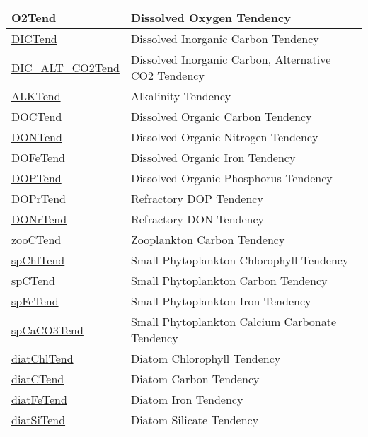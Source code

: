 {\begin{center}
\begin{longtable}{| p{2.0in} | p{4.0in} |}
    \hline
    \hyperref[subsec:var_sec_tend_O2Tend]{O2Tend} & Dissolved Oxygen Tendency \\
    \hline
    \hyperref[subsec:var_sec_tend_DICTend]{DICTend} & Dissolved Inorganic Carbon Tendency \\
    \hline
    \hyperref[subsec:var_sec_tend_DIC_ALT_CO2Tend]{DIC\_ALT\_CO2Tend} & Dissolved Inorganic Carbon, Alternative CO2 Tendency \\
    \hline
    \hyperref[subsec:var_sec_tend_ALKTend]{ALKTend} & Alkalinity Tendency \\
    \hline
    \hyperref[subsec:var_sec_tend_DOCTend]{DOCTend} & Dissolved Organic Carbon Tendency \\
    \hline
    \hyperref[subsec:var_sec_tend_DONTend]{DONTend} & Dissolved Organic Nitrogen Tendency \\
    \hline
    \hyperref[subsec:var_sec_tend_DOFeTend]{DOFeTend} & Dissolved Organic Iron Tendency \\
    \hline
    \hyperref[subsec:var_sec_tend_DOPTend]{DOPTend} & Dissolved Organic Phosphorus Tendency \\
    \hline
    \hyperref[subsec:var_sec_tend_DOPrTend]{DOPrTend} & Refractory DOP Tendency \\
    \hline
    \hyperref[subsec:var_sec_tend_DONrTend]{DONrTend} & Refractory DON Tendency \\
    \hline
    \hyperref[subsec:var_sec_tend_zooCTend]{zooCTend} & Zooplankton Carbon Tendency \\
    \hline
    \hyperref[subsec:var_sec_tend_spChlTend]{spChlTend} & Small Phytoplankton Chlorophyll Tendency \\
    \hline
    \hyperref[subsec:var_sec_tend_spCTend]{spCTend} & Small Phytoplankton Carbon Tendency \\
    \hline
    \hyperref[subsec:var_sec_tend_spFeTend]{spFeTend} & Small Phytoplankton Iron Tendency \\
    \hline
    \hyperref[subsec:var_sec_tend_spCaCO3Tend]{spCaCO3Tend} & Small Phytoplankton Calcium Carbonate Tendency \\
    \hline
    \hyperref[subsec:var_sec_tend_diatChlTend]{diatChlTend} & Diatom Chlorophyll Tendency \\
    \hline
    \hyperref[subsec:var_sec_tend_diatCTend]{diatCTend} & Diatom Carbon Tendency \\
    \hline
    \hyperref[subsec:var_sec_tend_diatFeTend]{diatFeTend} & Diatom Iron Tendency \\
    \hline
    \hyperref[subsec:var_sec_tend_diatSiTend]{diatSiTend} & Diatom Silicate Tendency \\

\end{longtable}
\end{center}}
